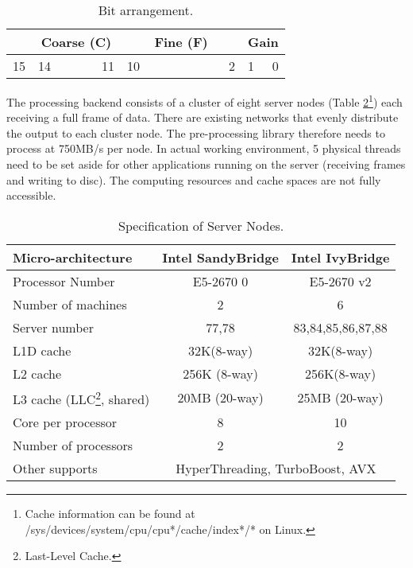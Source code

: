 \documentclass[journal]{IEEEtran}
\begin{document}
\begin{table}[h]
\centering

\begin{tabular}{r l c c c r l c c c c c c  r l r}
\hline
\multicolumn{1}{|c|}{} & 
\multicolumn{5}{|c|}{Coarse (C)} & 
\multicolumn{8}{|c|}{Fine (F)} &
\multicolumn{2}{|c|}{Gain} \\
\hline
 15 & 14 & & & & 11 & 10 & & & & & & & 2 & 1 & 0 \\
\end{tabular}
\caption{Bit arrangement.}\label{bit_arrangement}
\end{table}

The processing backend consists of a cluster of eight server nodes (Table \ref{servers}\footnote{Cache information can be found at /sys/devices/system/cpu/cpu*/cache/index*/* on Linux.})\cite{cite:hardwarespec} each receiving a full frame of data. There are existing networks that evenly distribute the output to each cluster node. The pre-processing library therefore needs to process at \texttildelow 750MB/s per node. In actual working environment, 5 physical threads need to be set aside for other applications running on the server (receiving frames and writing to disc). The computing resources and cache spaces are not fully accessible. 

\begin{table}[h]
\centering

\begin{tabular}{l | c c}
\hline
Micro-architecture & Intel SandyBridge & Intel IvyBridge \\
\hline
Processor Number& 	E5-2670 0	& E5-2670 v2 \\
Number of machines&	2		& 6	\\
Server number    & 77,78    & 83,84,85,86,87,88 \\
L1D cache	&	32K(8-way)		& 32K(8-way) \\
L2 cache  &	256K	(8-way)	& 256K(8-way) \\
L3 cache (LLC\footnote{Last-Level Cache.}, shared)	&	20MB (20-way)	& 25MB (20-way) \\
Core per processor  &	8		& 10	\\
Number of processors  &	2		& 2	\\
\hline
Other supports  & 
\multicolumn{2}{|c}{HyperThreading, TurboBoost, AVX}  	\\
\hline
\end{tabular}
\caption{Specification of Server Nodes.}\label{servers}
\end{table}
\end{document}
